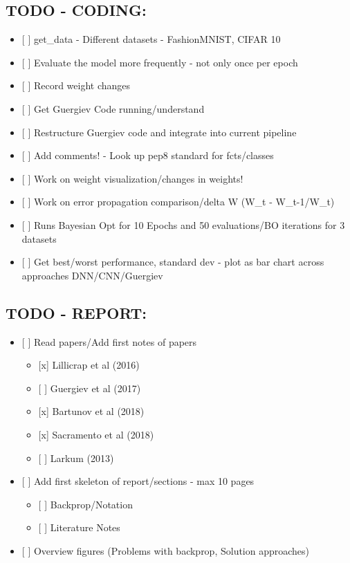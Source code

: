 \hypertarget{todo---coding}{%
\subsection{TODO - CODING:}\label{todo---coding}}

\begin{itemize}
\tightlist
\item
  {[} {]} get\_data - Different datasets - FashionMNIST, CIFAR 10
\item
  {[} {]} Evaluate the model more frequently - not only once per epoch
\item
  {[} {]} Record weight changes
\item
  {[} {]} Get Guergiev Code running/understand
\item
  {[} {]} Restructure Guergiev code and integrate into current pipeline
\item
  {[} {]} Add comments! - Look up pep8 standard for fcts/classes
\item
  {[} {]} Work on weight visualization/changes in weights!
\item
  {[} {]} Work on error propagation comparison/delta W
  (\textbar{}\textbar{}W\_t -
  W\_t-1\textbar{}\textbar{}/\textbar{}\textbar{}W\_t\textbar{}\textbar{})
\item
  {[} {]} Runs Bayesian Opt for 10 Epochs and 50 evaluations/BO
  iterations for 3 datasets
\item
  {[} {]} Get best/worst performance, standard dev - plot as bar chart
  across approaches DNN/CNN/Guergiev
\end{itemize}

\hypertarget{todo---report}{%
\subsection{TODO - REPORT:}\label{todo---report}}

\begin{itemize}
\tightlist
\item
  {[} {]} Read papers/Add first notes of papers

  \begin{itemize}
  \tightlist
  \item
    {[}x{]} Lillicrap et al (2016)
  \item
    {[} {]} Guergiev et al (2017)
  \item
    {[}x{]} Bartunov et al (2018)
  \item
    {[}x{]} Sacramento et al (2018)
  \item
    {[} {]} Larkum (2013)
  \end{itemize}
\item
  {[} {]} Add first skeleton of report/sections - max 10 pages

  \begin{itemize}
  \tightlist
  \item
    {[} {]} Backprop/Notation
  \item
    {[} {]} Literature Notes
  \end{itemize}
\item
  {[} {]} Overview figures (Problems with backprop, Solution approaches)
\end{itemize}

